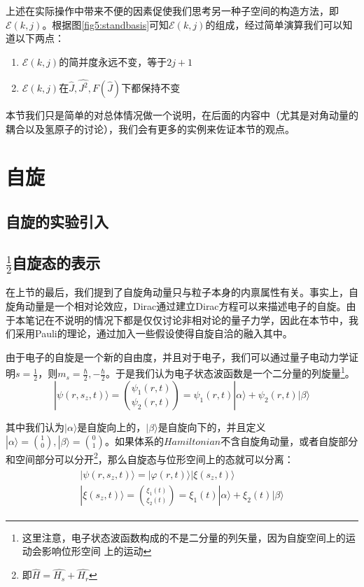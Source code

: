         上述在实际操作中带来不便的因素促使我们思考另一种子空间的构造方法，即$\mathcal{E}(k,j)$。根据图\ref{fig5:standbasis}可知$\mathcal{E}(k,j)$的组成，经过简单演算我们可以知道以下两点：
        \begin{enumerate}
            \item $\mathcal{E}(k,j)$的简并度永远不变，等于$2j+1$
            \item $\mathcal{E}(k,j)$在$\hat{J},\hat{J^2},F(\hat{J})$下都保持不变
        \end{enumerate}
        
        本节我们只是简单的对总体情况做一个说明，在后面的内容中（尤其是对角动量的耦合以及氢原子的讨论），我们会有更多的实例来佐证本节的观点。
\section{自旋}\label{section5:spin}
    \subsection{自旋的实验引入}
    
    
    \subsection{$\frac{1}{2}$自旋态的表示}
        在上节的最后，我们提到了自旋角动量只与粒子本身的内禀属性有关。事实上，自旋角动量是一个相对论效应，Dirac通过建立Dirac方程可以来描述电子的自旋。由于本笔记在不说明的情况下都是仅仅讨论非相对论的量子力学，因此在本节中，我们采用Pauli的理论，通过加入一些假设使得自旋自洽的融入其中。
        
        由于电子的自旋是一个新的自由度，并且对于电子，我们可以通过量子电动力学证明$s=\frac{1}{2}$，则$m_s=\frac{\hbar}{2},-\frac{\hbar}{2}$。于是我们认为电子状态波函数是一个二分量的列旋量\footnote{这里注意，电子状态波函数构成的不是二分量的列矢量，因为自旋空间上的运动会影响位形空间 上的运动}。
        \begin{equation}
            |\psi(r,s_z,t)\rangle=\binom{\psi_1(r,t)}{\psi_2(r,t)}=\psi_1(r,t)|\alpha \rangle+\psi_2(r,t)|\beta\rangle
        \end{equation}
        
        其中我们认为$|\alpha\rangle$是自旋向上的，$|\beta\rangle$是自旋向下的，并且定义$|\alpha\rangle=\binom{1}{0},|\beta\rangle=\binom{0}{1}$。如果体系的$Hamiltonian$不含自旋角动量，或者自旋部分和空间部分可以分开\footnote{即$\hat{H}=\hat{H_s}+\hat{H_r}$}，那么自旋态与位形空间上的态就可以分离：
        \begin{align}
            \begin{split}
                |\psi(r,s_z,t)\rangle=|\varphi(r,t)\rangle|\xi(s_z,t)\rangle\\
                |\xi(s_z,t)\rangle=\binom{\xi_1(t)}{\xi_2(t)}=\xi_1(t)|\alpha\rangle+\xi_2(t)|\beta \rangle
            \end{split}
        \end{align}
        
